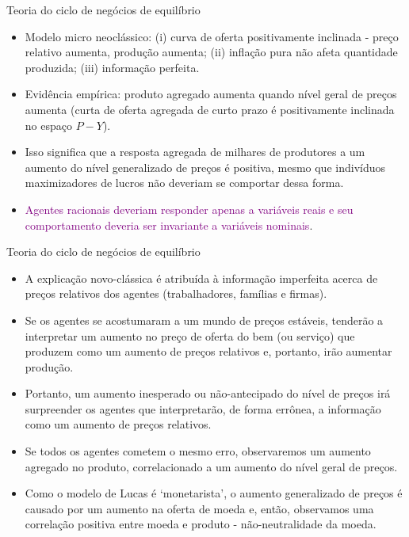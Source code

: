 \documentclass[10pt]{beamer}
\begin{document}
\begin{frame}{Teoria do ciclo de negócios de equilíbrio}
    \begin{itemize}
        \item Modelo micro neoclássico: (i) curva de oferta positivamente inclinada - preço relativo aumenta, produção aumenta; (ii) inflação pura não afeta quantidade produzida; (iii) informação perfeita.
        \bigskip
        \item Evidência empírica: produto agregado aumenta quando nível geral de preços aumenta (curta de oferta agregada de curto prazo é positivamente inclinada no espaço $P-Y$).
        \bigskip
        \item Isso significa que a resposta agregada de milhares de produtores a um aumento do nível generalizado de preços é positiva, mesmo que indivíduos maximizadores de lucros não deveriam se comportar dessa forma.
        \bigskip
        \item \textcolor{purple}{Agentes racionais deveriam responder apenas a variáveis reais e seu comportamento deveria ser invariante a variáveis nominais}.
    \end{itemize}
\end{frame}

\begin{frame}{Teoria do ciclo de negócios de equilíbrio}
    \begin{itemize}
        \item A explicação novo-clássica é atribuída à informação imperfeita acerca de preços relativos dos agentes (trabalhadores, famílias e firmas).
        \bigskip
        \item Se os agentes se acostumaram a um mundo de preços estáveis, tenderão a interpretar um aumento no preço de oferta do bem (ou serviço) que produzem como um aumento de preços relativos e, portanto, irão aumentar produção.
        \bigskip
        \item Portanto, um aumento inesperado ou não-antecipado do nível de preços irá surpreender os agentes que interpretarão, de forma errônea, a informação como um aumento de preços relativos.
        \bigskip
        \item Se todos os agentes cometem o mesmo erro, observaremos um aumento agregado no produto, correlacionado a um aumento do nível geral de preços.
        \bigskip
        \item Como o modelo de Lucas é `monetarista', o aumento generalizado de preços é causado por um aumento na oferta de moeda e, então, observamos uma correlação positiva entre moeda e produto - não-neutralidade da moeda.
    \end{itemize}
\end{frame}
\end{document}
